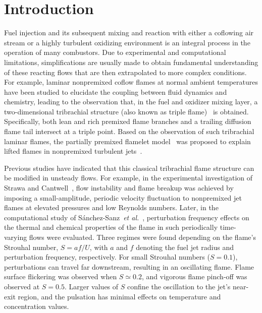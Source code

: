 \documentclass[review,3p,times]{elsarticle}
\begin{document}

\section{Introduction}

Fuel injection and its subsequent mixing and reaction with either a coflowing air stream or a highly turbulent oxidizing environment is an integral process in the operation of many combustors.  Due to experimental and computational limitations, simplifications are usually made to obtain fundamental understanding of these reacting flows that are then extrapolated to more complex conditions.  For example, laminar nonpremixed coflow flames at normal ambient temperatures have been studied to elucidate the coupling between fluid dynamics and chemistry, leading to the observation that, in the fuel and oxidizer mixing layer, a two-dimensional tribrachial structure (also known as triple flame)~\cite{buckmaster02} is obtained.  Specifically, both lean and rich premixed flame branches and a trailing diffusion flame tail intersect at a triple point.  Based on the observation of such tribrachial laminar flames, the partially premixed flamelet model~\cite{muller94} was proposed to explain lifted flames in nonpremixed turbulent jets~\cite{chung07}.

Previous studies have indicated that this classical tribrachial flame structure can be modified in unsteady flows.  For example, in the experimental investigation of Strawa and Cantwell~\cite{strawa89}, flow instability and flame breakup was achieved by imposing a small-amplitude, periodic velocity fluctuation to nonpremixed jet flames at elevated pressures and low Reynolds numbers.  Later, in the computational study of S\'{a}nchez-Sanz~\emph{et al.}~\cite{sanchezsanz10}, perturbation frequency effects on the thermal and chemical properties of the flame in such periodically time-varying flows were evaluated.  Three regimes were found depending on the flame's Strouhal number, $S = af/U$, with $a$ and $f$ denoting the fuel jet radius and perturbation frequency, respectively.  For small Strouhal numbers ($S = 0.1$), perturbations can travel far downstream, resulting in an oscillating flame.  Flame surface flickering was observed when $S\simeq 0.2$, and vigorous flame pinch-off was observed at $S = 0.5$.  Larger values of $S$ confine the oscillation to the jet's near-exit region, and the pulsation has minimal effects on temperature and concentration values.
\end{document}
